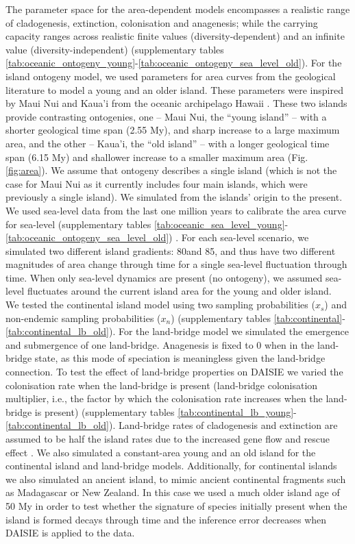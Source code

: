 \documentclass{article}
\begin{document}
The parameter space for the area-dependent models encompasses a realistic range of cladogenesis, extinction, colonisation and anagenesis; while the carrying capacity ranges across realistic finite values (diversity-dependent) and an infinite value (diversity-independent) \citep{valente_simple_2020} (supplementary tables \ref{tab:oceanic_ontogeny_young}-\ref{tab:oceanic_ontogeny_sea_level_old}). For the island ontogeny model, we used parameters for area curves from the geological literature to model a young and an older island. These parameters were inspired by Maui Nui and Kaua'i from the oceanic archipelago Hawaii \citep{lim_true_2017}. These two islands provide contrasting ontogenies, one -- Maui Nui, the “young island” -- with a shorter geological time span (2.55 My), and sharp increase to a large maximum area, and the other -- Kaua'i, the “old island” -- with a longer geological time span (6.15 My) and shallower increase to a smaller maximum area (Fig. \ref{fig:area}). We assume that ontogeny describes a single island (which is not the case for Maui Nui as it currently includes four main islands, which were previously a single island). We simulated from the islands’ origin to the present. We used sea-level data from the last one million years to calibrate the area curve for sea-level (supplementary tables \ref{tab:oceanic_sea_level_young}-\ref{tab:oceanic_ontogeny_sea_level_old}) \citep{bintanja_modelled_2005}. For each sea-level scenario, we simulated two different island gradients: 80\degree and 85\degree, and thus have two different magnitudes of area change through time for a single sea-level fluctuation through time. When only sea-level dynamics are present (no ontogeny), we assumed sea-level fluctuates around the current island area for the young and older island. \\

We tested the continental island model using two sampling probabilities ($x_s$) and non-endemic sampling probabilities ($x_n$) (supplementary tables \ref{tab:continental}-\ref{tab:continental_lb_old}). For the land-bridge model we simulated the emergence and submergence of one land-bridge. Anagenesis is fixed to 0 when in the land-bridge state, as this mode of speciation is meaningless given the land-bridge connection. To test the effect of land-bridge properties on DAISIE we varied the colonisation rate when the land-bridge is present (land-bridge colonisation multiplier, i.e., the factor by which the colonisation rate increases when the land-bridge is present) (supplementary tables \ref{tab:continental_lb_young}-\ref{tab:continental_lb_old}). Land-bridge rates of cladogenesis and extinction are assumed to be half the island rates due to the increased gene flow and rescue effect \citep{brown_turnover_1977, rosindell_unified_2011}. We also simulated a constant-area young and an old island for the continental island and land-bridge models. Additionally, for continental islands we also simulated an ancient island, to mimic ancient continental fragments such as Madagascar or New Zealand. In this case we used a much older island age of 50 My in order to test whether the signature of species initially present when the island is formed decays through time and the inference error decreases when DAISIE is applied to the data. 
\end{document}
